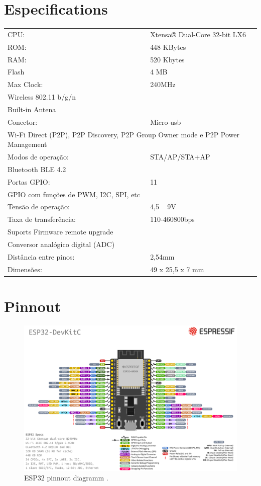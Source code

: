 

\section{Especifications}

    \begin{table}[h]
        \begin{tabular}{ll}
            CPU: & Xtensa® Dual-Core 32-bit LX6 \\
            ROM: & 448 KBytes \\
            RAM: & 520 Kbytes \\
            Flash & 4 MB \\
            Max Clock: & 240MHz \\
            \multicolumn{2}{l}{Wireless 802.11 b/g/n} \\
            \multicolumn{2}{l}{Built-in Antena} \\
            Conector: & Micro-usb \\
            \multicolumn{2}{l}{Wi-Fi Direct (P2P), P2P Discovery, P2P Group Owner mode e P2P Power Management} \\
            Modos de operação: & STA/AP/STA+AP \\
            Bluetooth BLE 4.2 \\
            Portas GPIO: & 11 \\ 
            GPIO com funções de PWM, I2C, SPI, etc \\
            Tensão de operação: & 4,5 ~ 9V \\
            Taxa de transferência: & 110-460800bps \\
            Suports Firmware remote upgrade \\
            Conversor analógico digital (ADC) \\
            Distância entre pinos: & 2,54mm \\
            Dimensões: & 49 x 25,5 x 7 mm
        \end{tabular}
    \end{table}
\pagebreak


\section{Pinnout}

    \begin{figure}[h]
        \centering
        \includegraphics[width=\textwidth]{AnexC/esp32-devkitC-v4-pinout.png}
        \caption{ESP32 pinnout diagramm \cite{espressif}.}
        \label{esp32_pins}
    \end{figure}